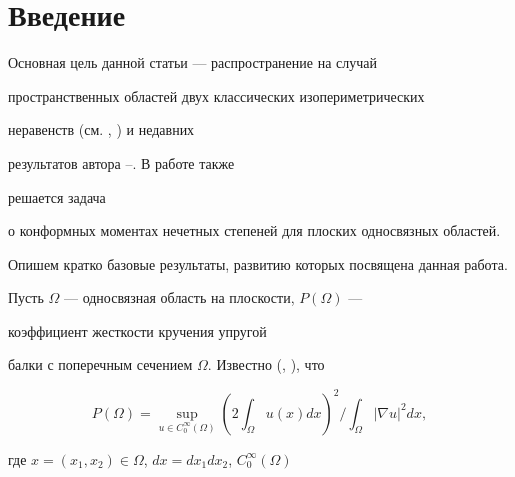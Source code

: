 

\pagestyle{plain} %







\maketitle


\label{begin}








\section{Введение}





Основная цель данной статьи --- распространение на случай


пространственных областей двух классических изопериметрических


неравенств (см. \cite{l1}, \cite{l2}) и недавних


результатов автора \cite{l3}--\cite{l5}. В работе также


решается задача \cite{l6}


о конформных моментах нечетных степеней для плоских односвязных областей.





Опишем кратко базовые результаты, развитию которых посвящена данная работа. 


Пусть $\Omega$ --- односвязная область на плоскости, $P(\Omega)$ --- 


коэффициент жесткости кручения упругой


балки с поперечным сечением $\Omega$. Известно (\cite{l1}, \cite{l2}), что


\begin{equation} \label{F1}


P(\Omega)=\sup_{u\in C_0^\infty(\Omega)}  \left( 2\int_\Omega


u(x) dx  \right)^2 \Big / \int_\Omega |\nabla u|^2dx,


\end{equation}


где $x=(x_1, x_2)\in \Omega$, $dx=dx_1dx_2$, $C_0^\infty (\Omega)$


